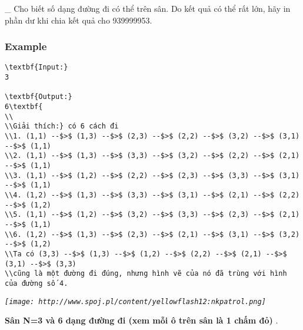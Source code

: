   \_ Cho biết số dạng đường đi có thể trên sân. Do kết quả có thể rất lớn, hãy in phần dư khi chia kết quả cho 939999953.  

\subsubsection{   Example  }
\begin{verbatim}
\textbf{Input:}
3

\textbf{Output:}
6\textbf{
\\
\\Giải thích:} có 6 cách đi
\\1. (1,1) --$>$ (1,3) --$>$ (2,3) --$>$ (2,2) --$>$ (3,2) --$>$ (3,1) --$>$ (1,1)
\\2. (1,1) --$>$ (1,3) --$>$ (3,3) --$>$ (3,2) --$>$ (2,2) --$>$ (2,1) --$>$ (1,1)
\\3. (1,1) --$>$ (1,2) --$>$ (2,2) --$>$ (2,3) --$>$ (3,3) --$>$ (3,1) --$>$ (1,1)
\\4. (1,2) --$>$ (1,3) --$>$ (3,3) --$>$ (3,1) --$>$ (2,1) --$>$ (2,2) --$>$ (1,2)
\\5. (1,1) --$>$ (1,2) --$>$ (3,2) --$>$ (3,3) --$>$ (2,3) --$>$ (2,1) --$>$ (1,1)
\\6. (1,2) --$>$ (1,3) --$>$ (2,3) --$>$ (2,1) --$>$ (3,1) --$>$ (3,2) --$>$ (1,2)
\\Ta có (3,3) --$>$ (1,3) --$>$ (1,2) --$>$ (2,2) --$>$ (2,1) --$>$ (3,1) --$>$ (3,3) 
\\cũng là một đường đi đúng, nhưng hình vẽ của nó đã trùng với hình của đường số 4.\end{verbatim}

\emph{
\texttt{[image: http://www.spoj.pl/content/yellowflash12:nkpatrol.png]}}

\textbf{    Sân N=3 và 6 dạng đường đi (xem mỗi ô trên sân là 1 chấm đỏ)   }   .  
